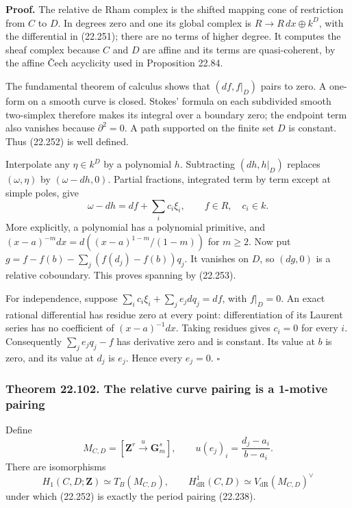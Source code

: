 \documentclass[
  11pt,
  a4paper,
]{article}
\begin{document}
\textbf{Proof.} The relative de Rham complex is the shifted mapping cone
of restriction from \(C\) to \(D\). In degrees zero and one its global
complex is \(R\to R\,dx\oplus k^D\), with the differential in (22.251);
there are no terms of higher degree. It computes the sheaf complex
because \(C\) and \(D\) are affine and its terms are quasi-coherent, by
the affine Čech acyclicity used in Proposition 22.84.

The fundamental theorem of calculus shows that \((df,f|_D)\) pairs to
zero. A one-form on a smooth curve is closed. Stokes' formula on each
subdivided smooth two-simplex therefore makes its integral over a
boundary zero; the endpoint term also vanishes because \(\partial^2=0\).
A path supported on the finite set \(D\) is constant. Thus (22.252) is
well defined.

Interpolate any \(\eta\in k^D\) by a polynomial \(h\). Subtracting
\((dh,h|_D)\) replaces \((\omega,\eta)\) by \((\omega-dh,0)\). Partial
fractions, integrated term by term except at simple poles, give \[
 \omega-dh=df+\sum_i c_i\xi_i,\qquad f\in R,\quad c_i\in k.
\] More explicitly, a polynomial has a polynomial primitive, and
\((x-a)^{-m}dx=d((x-a)^{1-m}/(1-m))\) for \(m\ge2\). Now put
\(g=f-f(b)-\sum_j(f(d_j)-f(b))q_j\). It vanishes on \(D\), so \((dg,0)\)
is a relative coboundary. This proves spanning by (22.253).

For independence, suppose \(\sum_i c_i\xi_i+\sum_j e_jdq_j=df\), with
\(f|_D=0\). An exact rational differential has residue zero at every
point: differentiation of its Laurent series has no coefficient of
\((x-a)^{-1}dx\). Taking residues gives \(c_i=0\) for every \(i\).
Consequently \(\sum_j e_jq_j-f\) has derivative zero and is constant.
Its value at \(b\) is zero, and its value at \(d_j\) is \(e_j\). Hence
every \(e_j=0\). \(\square\)

\subsubsection{Theorem 22.102. The relative curve pairing is a 1-motive
pairing}\label{theorem-22.102.-the-relative-curve-pairing-is-a-1-motive-pairing}

Define \[
 M_{C,D}=[\mathbf Z^r\xrightarrow{u}\mathbf G_m^s],
 \qquad
 u(e_j)_i=\frac{d_j-a_i}{b-a_i}.
 \tag{22.254}
\] There are isomorphisms \[
 H_1(C,D;\mathbf Z)\simeq T_B(M_{C,D}),\qquad
 H^1_{\mathrm{dR}}(C,D)\simeq V_{\mathrm{dR}}(M_{C,D})^\vee
\] under which (22.252) is exactly the period pairing (22.238).
\end{document}
